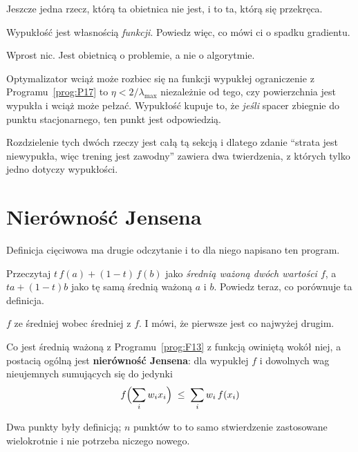 \begin{fr}
Jeszcze jedna rzecz, którą ta obietnica nie jest, i to ta, którą się
przekręca.

Wypukłość jest własnością \emph{funkcji}. Powiedz więc, co mówi ci o spadku
gradientu.
\nextframe
\end{fr}

\begin{fr}
\begin{ansblock}
Wprost nic. Jest obietnicą o problemie, a nie o algorytmie.
\end{ansblock}

Optymalizator wciąż może rozbiec się na funkcji wypukłej \dash{} ograniczenie
z Programu~\ref{prog:P17} to $\eta < 2/\lambda_{\max}$ niezależnie od tego,
czy powierzchnia jest wypukła \dash{} i wciąż może pełzać. Wypukłość kupuje
to, że \emph{jeśli} spacer zbiegnie do punktu stacjonarnego, ten punkt jest
odpowiedzią.

Rozdzielenie tych dwóch rzeczy jest całą tą sekcją i dlatego zdanie
\enquote{strata jest niewypukła, więc trening jest zawodny} zawiera dwa
twierdzenia, z których tylko jedno dotyczy wypukłości.
\end{fr}

\section{Nierówność Jensena}
\label{sec:P19-jensen}

\begin{fr}
Definicja cięciwowa ma drugie odczytanie i to dla niego napisano ten program.

Przeczytaj $t\,f(a) + (1-t)\,f(b)$ jako \emph{średnią ważoną dwóch wartości
$f$}, a $t a + (1-t) b$ jako tę samą średnią ważoną $a$ i $b$. Powiedz teraz,
co porównuje ta definicja.
\dotline
\nextframe
\end{fr}

\begin{fr}
\begin{ansblock}
$f$ ze średniej wobec średniej z $f$. I mówi, że pierwsze jest co najwyżej
drugim.
\end{ansblock}

Co jest średnią ważoną z Programu~\ref{prog:F13} z funkcją owiniętą wokół
niej, a postacią ogólną jest \textbf{nierówność Jensena}: dla wypukłej $f$ i
dowolnych wag nieujemnych sumujących się do jedynki
\[ f\Bigl(\sum_i w_i x_i\Bigr) \;\le\; \sum_i w_i\, f(x_i) \]

Dwa punkty były definicją; $n$ punktów to to samo stwierdzenie zastosowane
wielokrotnie i nie potrzeba niczego nowego.
\end{fr}

